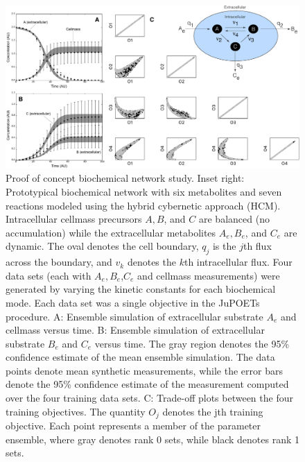 \documentclass[12pt]{article}
\begin{document}
\begin{figure}[h]
  \includegraphics[width=1.0\textwidth]{./figs/Figure-4-BiochemicalProofOfConcept.pdf}
  \caption{Proof of concept biochemical network study.
  Inset right: Prototypical biochemical network with six metabolites and seven reactions modeled using the hybrid cybernetic approach (HCM).
  Intracellular cellmass precursors $A,B$, and $C$ are balanced (no accumulation) while the extracellular metabolites $A_{e},B_{e}$, and $C_{e}$ are dynamic.
  The oval denotes the cell boundary, $q_{j}$ is the $j$th flux across the boundary, and $v_{k}$ denotes the $k$th intracellular flux.
  Four data sets (each with $A_{e},B_{e}$,$C_{e}$ and cellmass measurements) were generated by varying the kinetic constants for each biochemical mode.
  Each data set was a single objective in the JuPOETs procedure.
  A: Ensemble simulation of extracellular substrate $A_{e}$ and cellmass versus time.
  B: Ensemble simulation of extracellular substrate $B_{e}$ and $C_{e}$ versus time.
  The gray region denotes the 95\% confidence estimate of the mean ensemble simulation.
  The data points denote mean synthetic measurements, while the error bars denote the 95\% confidence estimate of the measurement computed over the four training data sets.
  C: Trade-off plots between the four training objectives. The quantity $O_{j}$ denotes the jth training objective.
  Each point represents a member of the parameter ensemble, where gray denotes rank 0 sets, while black denotes rank 1 sets.
   }\label{fig:fig-biochemical}
\end{figure}
\end{document}
